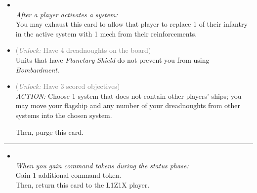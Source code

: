 \begin{multicols}{2}

\begin{itemize}
\item {}\\
\emph{After a player activates a system:}
\\
You may exhaust this card to allow that player to replace 1 of their infantry in the active system with 1 mech from their reinforcements.
\item {} \textcolor{gray}{(\emph{Unlock:} Have 4 dreadnoughts on the board)}\\
Units that have \emph{Planetary Shield} do not prevent you from using \emph{Bombardment}.
\item {} \textcolor{gray}{(\emph{Unlock:} Have 3 scored objectives)}\\
\emph{ACTION:} Choose 1 system that does not contain other players' ships; you may move your flagship and any number of your dreadnoughts from other systems into the chosen system.

Then, purge this card. 
\end{itemize}

\vspace{-10pt}\rule{\hsize}{0.4pt}\vspace{5pt}


\begin{itemize}
\item {}\\
\emph{When you gain command tokens during the status phase:}\\
Gain 1 additional command token.\\
Then, return this card to the L1Z1X player.
\end{itemize}

\end{multicols}



